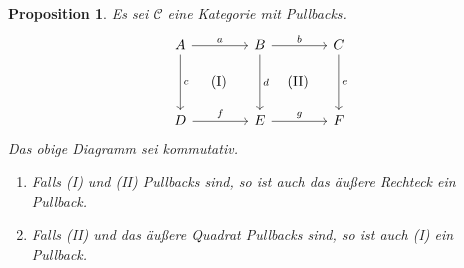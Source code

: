 \documentclass[a4paper, parskip=half]{scrartcl}
\theoremstyle{marginbreak}
\newtheorem{proposition}[remark]{Proposition}
\theoremstyle{nonumberplain}
\newtheorem{proof}{Beweis.}
\newcommand\cat\mathcal
\newcommand{\p}[1]{\iftoggle{proofs}{#1}{}}
\begin{document}
		\begin{proposition}\label{2-5-9}
			Es sei $\cat{C}$ eine Kategorie mit Pullbacks.
			\[
				\begin{tikzcd}[sep=4em]
					A \ar{r}{a} \ar[phantom]{dr}{\text{(I)}} \ar{d}{c} & B \ar[phantom]{dr}{\text{(II)}} \ar{r}{b} \ar{d}{d} & C \ar{d}{e}\\
					D \ar{r}{f} & E \ar{r}{g} & F
				\end{tikzcd}
			\]
			Das obige Diagramm sei kommutativ.
			\begin{enumerate}
				\item Falls (I) und (II) Pullbacks sind, so ist auch das äußere
					Rechteck ein Pullback.
				\item Falls (II) und das äußere Quadrat Pullbacks sind, so ist auch
					(I) ein Pullback.
			\end{enumerate}
		\end{proposition}
		\p{\begin{proof}\leavevmode
			\begin{enumerate}
				\item Es seien $x\colon X\to D$, $y\colon X\to C$ mit $g\circ f\circ x = e\circ y$.
					Pullback (II) liefert ein eindeutiges $z\colon X\to B$, sodass
					$b\circ z = y$, $d\circ z = f\circ x$. Letztere Gleichheit und Pullback
					(I) geben ein eindeutiges $w\colon X\to A$, sodass $a\circ w = z$, $c\circ w = x$.
					Insbesondere gilt $b\circ a\circ w = b\circ z = y$. Es sei $w'\colon X\to A$ ein
					weiterer Morphismus mit $b\circ a\circ w' = y$ und $c\circ w' = x$. Es gilt also
					$b\circ (a\circ w') = y = b\circ (a\circ w)$ und
					$d\circ(a\circ w') = f\circ (c\circ w') = f\circ x = f\circ c\circ w = d\circ (a\circ w)$.
					Pullback (II) liefert $a\circ w'=a\circ w$. Weiter ist $c\circ w'= x = c\circ w$.
					Pullback (I) liefert $w=w'$.
				\item Es sei $(A', c', a')$ der Pullback von $f$ und $d$.
					Wegen $d\circ a=f\circ c$ erhalten wir eine eindeutige Faktorisierung
					$h\colon A\to A'$ mit $a'\circ h=a$, $c'\circ h=c$.
					Mit (1) und da (II) ein Pullback ist, ist $(A', c', b\circ a')$ ein Pullback von
					$(g\circ f, e)$. Es ist jedoch auch $(A, c, b\circ a)$ ein Pullback von $(g\circ f, e)$.
					Da Limiten eindeutig sind, folgt $A\cong A'$. Es gilt $c'\circ h=c$
					und $b\circ a'\circ h = b\circ a$, also ist $h$ \emph{die} Faktorisierung
					zwischen den beiden Pullbacks. Da Limiten eindeutig sind, ist $A\cong A'$,
					also muss $h$ ein Isomorphismus sein.
					\end{enumerate}
		\end{proof}}
\end{document}
